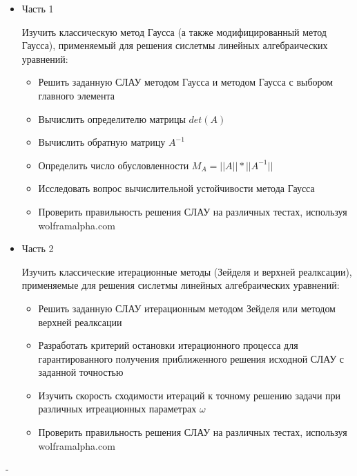 \documentclass[a4paper,12pt,titlepage,finall]{article}
\begin{document}
\begin{itemize}

\item Часть 1

Изучить классическую метод Гаусса (а также модифицированный метод Гаусса), применяемый для решения сислетмы линейных алгебраических уравнений:

\begin{itemize}
\item Решить заданную СЛАУ  методом Гаусса и методом Гаусса с выбором главного элемента
\item Вычислить определителю матрицы $det(A)$
\item Вычислить обратную матрицу  $A ^ {-1}$
\item Определить число обусловленности $M_A = ||A|| * ||A ^ {-1}||$
\item Исследовать вопрос вычислительной  устойчивости метода Гаусса
\item Проверить правильность решения СЛАУ на различных тестах, используя wolframalpha.com
\end{itemize}

\item Часть 2

Изучить классические итерационные методы (Зейделя и верхней реалксации), применяемые для решения сислетмы линейных алгебраических уравнений:

\begin{itemize}
\item Решить заданную СЛАУ итерационным методом Зейделя или методом верхней реалксации
\item Разработать критерий остановки итерационного процесса для гарантированного получения приближенного решения исходной СЛАУ с заданной точностью
\item Изучить скорость сходимости итераций к точному решению задачи при различных итреационных параметрах $\omega$
\item Проверить правильность решения СЛАУ на различных тестах, используя wolframalpha.com
\end{itemize}

\end{itemize}
\newpage
-
\end{document}
